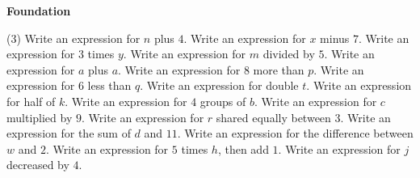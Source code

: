 \documentclass[17pt,a4paper,landscape]{extarticle}
\begin{document}
\sffamily
\boldmath

\boldmath

{\LARGE \textbf{Foundation}}
\begin{tasks}(3)
\task Write an expression for \mbox{$n$} plus \mbox{$4$}.
\task Write an expression for \mbox{$x$} minus \mbox{$7$}.
\task Write an expression for \mbox{$3$} times \mbox{$y$}.
\task Write an expression for \mbox{$m$} divided by \mbox{$5$}.
\task Write an expression for \mbox{$a$} plus \mbox{$a$}.
\task Write an expression for \mbox{$8$} more than \mbox{$p$}.
\task Write an expression for \mbox{$6$} less than \mbox{$q$}.
\task Write an expression for double \mbox{$t$}.
\task Write an expression for half of \mbox{$k$}.
\task Write an expression for \mbox{$4$} groups of \mbox{$b$}.
\task Write an expression for \mbox{$c$} multiplied by \mbox{$9$}.
\task Write an expression for \mbox{$r$} shared equally between \mbox{$3$}.
\task Write an expression for the sum of \mbox{$d$} and \mbox{$11$}.
\task Write an expression for the difference between \mbox{$w$} and \mbox{$2$}.
\task Write an expression for \mbox{$5$} times \mbox{$h$}, then add \mbox{$1$}.
\task Write an expression for \mbox{$j$} decreased by \mbox{$4$}.
\end{tasks}
\end{document}
